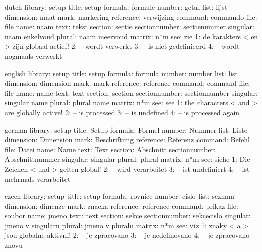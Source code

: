 
\startmessages  dutch  library: setup
        title:  setup
      formula:  formule
       number:  getal
         list:  lijst
    dimension:  maat
         mark:  markering
    reference:  verwijzing
      command:  commando
         file:  file
         name:  naam
         text:  tekst
      section:  sectie
sectionnumber:  sectienummer
     singular:  naam enkelvoud
       plural:  naam meervoud
       matrix:  n*m
          see:  zie
            1:  de karakters < en > zijn globaal actief!
            2:  -- wordt verwerkt
            3:  -- is niet gedefinieerd
            4:  -- wordt nogmaals verwerkt
\stopmessages

\startmessages  english  library: setup
        title:  setup
      formula:  formula
       number:  number
         list:  list
    dimension:  dimension
         mark:  mark
    reference:  reference
      command:  command
         file:  file
         name:  name
         text:  text
      section:  section
sectionnumber:  sectionnumber
     singular:  singular name
       plural:  plural name
       matrix:  n*m
          see:  see
            1:  the characters < and > are globally active!
            2:  -- is processed
            3:  -- is undefined
            4:  -- is processed again
\stopmessages

\startmessages  german library: setup
        title:  Setup
      formula:  Formel
       number:  Nummer
         list:  Liste
    dimension:  Dimension
         mark:  Beschriftung
    reference:  Referenz
      command:  Befehl
         file:  Datei
         name:  Name
         text:  Text
      section:  Abschnitt
sectionnumber:  Abschnittnummer
     singular:  singular
       plural:  plural
       matrix:  n*m
          see:  siehe
            1:  Die Zeichen < und > gelten global!
            2:  -- wird verarbeitet
            3:  -- ist undefiniert
            4:  -- ist mehrmals verarbeitet
\stopmessages

\startmessages  czech  library: setup
        title:  setup
      formula:  rovnice
       number:  cislo
         list:  seznam
    dimension:  dimenze
         mark:  znacka
    reference:  reference
      command:  prikaz
         file:  soubor
         name:  jmeno
         text:  text
      section:  sekce
sectionnumber:  sekcecislo %
     singular:  jmeno v singularu
       plural:  jmeno v pluralu
       matrix:  n*m
          see:  viz
            1:  znaky < a > jsou globalne aktivni!
            2:  -- je zpracovano
            3:  -- je nedefinovano
            4:  -- je zpracovano znovu
\stopmessages

